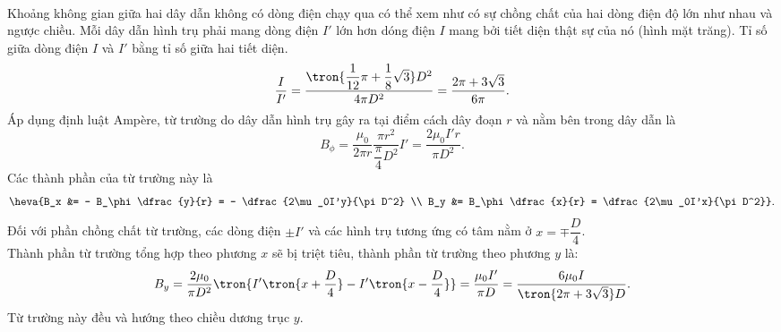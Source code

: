 \begin{loigiai}\\
Khoảng không gian giữa hai dây dẫn không có dòng điện chạy qua có thể xem như có sự chồng chất của hai dòng điện độ lớn như nhau và ngược chiều. Mỗi dây dẫn hình trụ phải mang dòng điện $I'$ lớn hơn dóng điện $I$ mang bởi tiết diện thật sự của nó (hình mặt trăng). Tỉ số  giữa dòng điện $I$ và $I'$ bằng tỉ số giữa hai tiết diện.
\[\dfrac{I}{I'} = \dfrac{\tron{\dfrac{1}{12}\pi + \dfrac{1}{8}\sqrt{3}}D^2}{4\pi D^2} = \dfrac{2\pi + 3\sqrt{3}}{6\pi}.\]
Áp dụng định luật Ampère, từ trường do dây dẫn hình trụ gây ra tại điểm cách dây đoạn $r$ và nằm bên trong dây dẫn là
\[B_\phi = \dfrac{\mu_0}{2\pi r} \dfrac{\pi r^2}{\dfrac{\pi}{4}D^2}I' = \dfrac{2\mu_0I'r}{\pi D^2}.\]
Các thành phần của từ trường này là
\[\heva{B_x &= - B_\phi \dfrac{y}{r} =  - \dfrac{2\mu_0I'y}{\pi D^2} \\ B_y &= B_\phi \dfrac{x}{r} = \dfrac{2\mu_0I'x}{\pi D^2}}.\]
Đối với phần chồng chất từ trường, các dòng điện $\pm I'$ và các hình trụ tương ứng có tâm nằm ở $x = \mp \dfrac{D}{4}$.\\
Thành phần từ trường tổng hợp theo phương $x$ sẽ bị triệt tiêu, thành phần từ trường theo phương $y$ là:
\[B_y = \dfrac{2\mu_0}{\pi D^2} \tron{I'\tron{x + \dfrac{D}{4}} - I'\tron{x - \dfrac{D}{4}}} = \dfrac{\mu_0I'}{\pi D} = \dfrac{6\mu_0I}{\tron{2\pi + 3\sqrt{3}}D}.\]
Từ trường này đều và hướng theo chiều dương trục $y$.
\end{loigiai}


